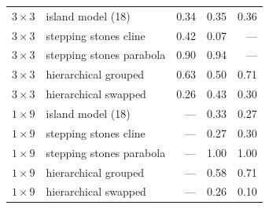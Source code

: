 \begin{table}[htbp]
\begin{tabular}{llrrr}
$3 \times 3$ & island model (18) & 0.34 & 0.35 & 0.36 \\
$3 \times 3$ & stepping stones cline & 0.42 & 0.07 & --- \\
$3 \times 3$ & stepping stones parabola & 0.90 & 0.94 & --- \\
$3 \times 3$ & hierarchical grouped & 0.63 & 0.50 & 0.71 \\
$3 \times 3$ & hierarchical swapped & 0.26 & 0.43 & 0.30 \\
\midrule
$1 \times 9$ & island model (18) & --- & 0.33 & 0.27 \\
$1 \times 9$ & stepping stones cline & --- & 0.27 & 0.30 \\
$1 \times 9$ & stepping stones parabola & --- & 1.00 & 1.00 \\
$1 \times 9$ & hierarchical grouped & --- & 0.58 & 0.71 \\
$1 \times 9$ & hierarchical swapped & --- & 0.26 & 0.10 \\
\bottomrule
\end{tabular}
\end{table}

